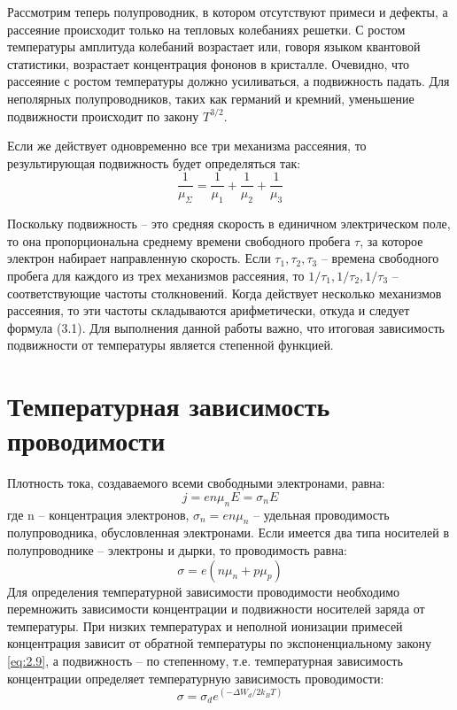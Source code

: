 Рассмотрим теперь полупроводник, в котором отсутствуют примеси и дефекты, а рассеяние происходит только на тепловых
колебаниях решетки. С ростом температуры амплитуда колебаний возрастает или, говоря языком квантовой статистики,
возрастает концентрация фононов в кристалле. Очевидно, что рассеяние с ростом температуры должно усиливаться, а
подвижность падать. Для неполярных полупроводников, таких как германий и кремний, уменьшение подвижности происходит по
закону $T^{3/2}$. 

Если же действует одновременно все три механизма рассеяния, то результирующая подвижность будет определяться так: 
\begin{equation}
	\frac{1}{\mu_{\Sigma}} = \frac{1}{\mu_{1}}+\frac{1}{\mu_{2}}+\frac{1}{\mu_{3}}
	\label{eq:3.1}
\end{equation}

Поскольку подвижность – это средняя скорость в единичном электрическом поле, то она пропорциональна среднему времени
свободного пробега $\tau$, за которое электрон набирает направленную скорость. Если $\tau_1, \tau_2,\tau_3$ – времена свободного
пробега для каждого из трех механизмов рассеяния, то $1/\tau_1,1/\tau_2,1/\tau_3$ – соответствующие частоты столкновений. Когда
действует несколько механизмов рассеяния, то эти частоты складываются арифметически, откуда и следует формула (3.1). Для
выполнения данной работы важно, что итоговая зависимость подвижности от температуры является степенной функцией.

\section{Температурная зависимость проводимости}
Плотность тока, создаваемого всеми свободными электронами, равна:
\begin{equation}
	j=e n \mu_{n} E=\sigma_{n} E
	\label{eq:4.1}
\end{equation}
где n – концентрация электронов, $\sigma_n = e n \mu_n$ – удельная проводимость полупроводника, обусловленная электронами.
Если имеется два типа носителей в полупроводнике – электроны и дырки,
то проводимость равна:
\begin{equation}
	\sigma=e\left(n \mu_{n}+p \mu_{p}\right)
	\label{eq:4.2}
\end{equation}
Для определения температурной зависимости проводимости необходимо перемножить зависимости концентрации и подвижности носителей заряда от
температуры. При низких температурах и неполной ионизации примесей концентрация зависит от обратной температуры по экспоненциальному закону
\eqref{eq:2.9}, а подвижность – по степенному, т.е. температурная зависимость концентрации определяет температурную зависимость проводимости:
\begin{equation}
	\sigma=\sigma_{d} e^{\left(-\Delta W_{d} / 2 k_{B} T\right)}
	\label{eq:4.3}
\end{equation}

